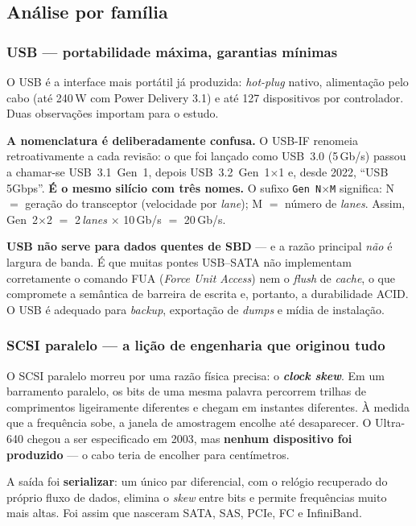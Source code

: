 \documentclass[11pt,a4paper]{article}
\begin{document}
\subsection{Análise por família}

\subsubsection{USB --- portabilidade máxima, garantias mínimas}

O USB é a interface mais portátil já produzida: \emph{hot-plug} nativo, alimentação pelo
cabo (até 240\,W com Power Delivery 3.1) e até 127 dispositivos por controlador. Duas
observações importam para o estudo.

\textbf{A nomenclatura é deliberadamente confusa.} O USB-IF renomeia retroativamente a cada
revisão: o que foi lançado como USB~3.0 (5\,Gb/s) passou a chamar-se USB~3.1~Gen~1, depois
USB~3.2~Gen~1$\times$1 e, desde 2022, ``USB 5Gbps''. \textbf{É o mesmo silício com três
nomes.} O sufixo \texttt{Gen~N$\times$M} significa: N $=$ geração do transceptor
(velocidade por \emph{lane}); M $=$ número de \emph{lanes}. Assim, Gen~2$\times$2 $=$
2\,\emph{lanes} $\times$ 10\,Gb/s $=$ 20\,Gb/s.

\textbf{USB não serve para dados quentes de SBD} --- e a razão principal \emph{não} é
largura de banda. É que muitas pontes USB--SATA não implementam corretamente o comando FUA
(\emph{Force Unit Access}) nem o \emph{flush} de \emph{cache}, o que compromete a semântica
de barreira de escrita e, portanto, a durabilidade ACID. O USB é adequado para
\emph{backup}, exportação de \emph{dumps} e mídia de instalação.

\subsubsection{SCSI paralelo --- a lição de engenharia que originou tudo}

O SCSI paralelo morreu por uma razão física precisa: o \textbf{\emph{clock skew}}. Em um
barramento paralelo, os bits de uma mesma palavra percorrem trilhas de comprimentos
ligeiramente diferentes e chegam em instantes diferentes. À medida que a frequência sobe, a
janela de amostragem encolhe até desaparecer. O Ultra-640 chegou a ser especificado em 2003,
mas \textbf{nenhum dispositivo foi produzido} --- o cabo teria de encolher para centímetros.

A saída foi \textbf{serializar}: um único par diferencial, com o relógio recuperado do
próprio fluxo de dados, elimina o \emph{skew} entre bits e permite frequências muito mais
altas. Foi assim que nasceram SATA, SAS, PCIe, FC e InfiniBand.
\end{document}
